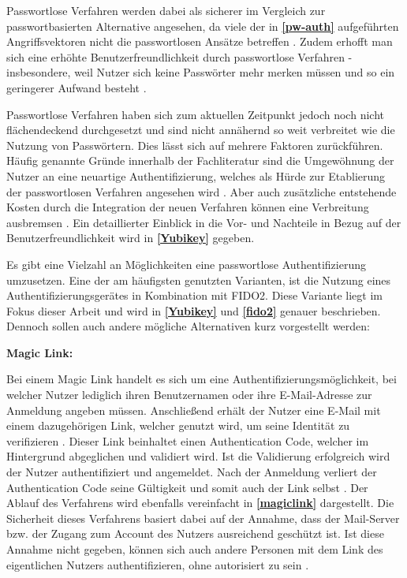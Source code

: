 Passwortlose Verfahren werden dabei als sicherer im Vergleich zur passwortbasierten Alternative angesehen, da viele der in \textbf{\ref{pw-auth}} aufgeführten Angriffsvektoren nicht die passwortlosen Ansätze betreffen \cite{chowhan2019password} \cite{parmar2022comprehensive}. Zudem erhofft man sich eine erhöhte Benutzerfreundlichkeit durch passwortlose Verfahren - insbesondere, weil Nutzer sich keine Passwörter mehr merken müssen und so ein geringerer Aufwand besteht \cite{chowhan2019password}.

Passwortlose Verfahren haben sich zum aktuellen Zeitpunkt jedoch noch nicht flächendeckend durchgesetzt und sind nicht annähernd so weit verbreitet wie die Nutzung von Passwörtern. Dies lässt sich auf mehrere Faktoren zurückführen. Häufig genannte Gründe innerhalb der Fachliteratur sind die Umgewöhnung der Nutzer an eine neuartige Authentifizierung, welches als Hürde zur Etablierung der passwortlosen Verfahren angesehen wird \cite{chowhan2019password}. Aber auch zusätzliche entstehende Kosten durch die Integration der neuen Verfahren können eine Verbreitung ausbremsen \cite{chowhan2019password}. Ein detaillierter Einblick in die Vor- und Nachteile in Bezug auf der Benutzerfreundlichkeit wird in \textbf{\ref{Yubikey}} gegeben.

Es gibt eine Vielzahl an Möglichkeiten eine passwortlose Authentifizierung umzusetzen. Eine der am häufigsten genutzten Varianten, ist die Nutzung eines Authentifizierungsgerätes in Kombination mit \ac{FIDO}2. Diese Variante liegt im Fokus dieser Arbeit und wird in \textbf{\ref{Yubikey}} und \textbf{\ref{fido2}} genauer beschrieben. Dennoch sollen auch andere mögliche Alternativen kurz vorgestellt werden:

\textbf{Magic Link:}

Bei einem Magic Link handelt es sich um eine
Authentifizierungsmöglichkeit, bei welcher Nutzer
lediglich ihren Benutzernamen oder ihre E-Mail-Adresse
zur Anmeldung angeben müssen. Anschließend erhält der Nutzer eine E-Mail mit einem dazugehörigen Link, welcher genutzt wird, um seine Identität zu verifizieren \cite{chowhan2019password} \cite{parmar2022comprehensive}.
Dieser Link beinhaltet einen Authentication Code, welcher im Hintergrund abgeglichen und validiert wird. Ist die Validierung erfolgreich wird der Nutzer authentifiziert und angemeldet. Nach der Anmeldung verliert der Authentication Code seine Gültigkeit und somit auch der Link selbst \cite{chowhan2019password}. Der Ablauf des Verfahrens wird ebenfalls vereinfacht in \textbf{\ref{magiclink}} dargestellt.
Die Sicherheit dieses Verfahrens basiert dabei auf der Annahme, dass der Mail-Server bzw. der Zugang zum Account des Nutzers ausreichend geschützt ist. Ist diese Annahme nicht gegeben, können sich auch andere Personen mit dem Link des eigentlichen Nutzers authentifizieren, ohne autorisiert zu sein \cite{chowhan2019password}. 

